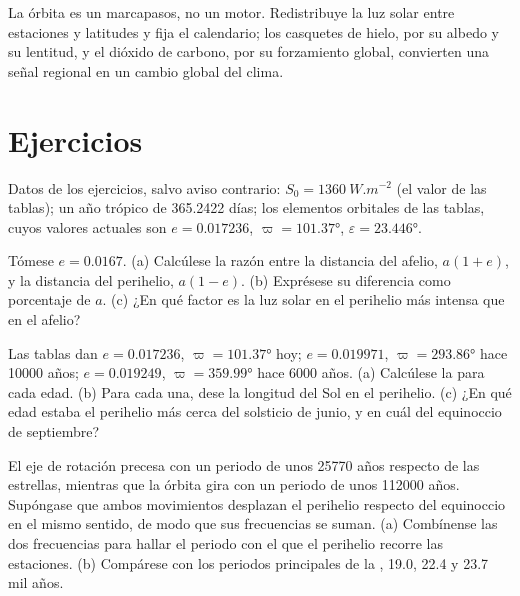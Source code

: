 La órbita es un marcapasos, no un motor. Redistribuye la luz solar entre estaciones y latitudes
y fija el calendario; los casquetes de hielo, por su albedo y su lentitud, y el dióxido de carbono, por
su forzamiento global, convierten una señal regional en un cambio global del clima.

\section*{Ejercicios}\label{sec:b2:orbital-forcing:exercises}

Datos de los ejercicios, salvo aviso contrario: $S_0 = \qty{1360}{W.m^{-2}}$ (el valor de las
tablas); un año trópico de \num{365.2422} días; los elementos orbitales de las tablas, cuyos valores actuales son
$e = 0.017236$, $\varpi = \ang{101.37}$, $\varepsilon = \ang{23.446}$.

\begin{exercise}[$\star$]\label{exo:b2:orbital-forcing:1}
Tómese $e = 0.0167$. (a) Calcúlese la razón entre la distancia del afelio, $a(1 + e)$, y la distancia
del perihelio, $a(1 - e)$. (b) Exprésese su diferencia como porcentaje de $a$. (c) ¿En qué factor es
la luz solar en el perihelio más intensa que en el afelio?
\end{exercise}

\begin{exercise}[$\star$]\label{exo:b2:orbital-forcing:2}
Las tablas dan $e = 0.017236$, $\varpi = \ang{101.37}$ hoy; $e = 0.019971$, $\varpi =
\ang{293.86}$ hace \num{10000} años; $e = 0.019249$, $\varpi = \ang{359.99}$ hace \num{6000} años.
(a) Calcúlese la  para cada edad. (b) Para cada una, dese la longitud del Sol en el
perihelio. (c) ¿En qué edad estaba el perihelio más cerca del solsticio de junio, y en cuál del
equinoccio de septiembre?
\end{exercise}

\begin{exercise}[$\star$]\label{exo:b2:orbital-forcing:3}
El eje de rotación precesa con un periodo de unos \num{25770} años respecto de las estrellas, mientras que
la órbita gira con un periodo de unos \num{112000} años. Supóngase que ambos movimientos desplazan el
perihelio respecto del equinoccio en el mismo sentido, de modo que sus frecuencias se suman. (a) Combínense
las dos frecuencias para hallar el periodo con el que el perihelio
recorre las estaciones. (b) Compárese con los periodos principales de la , \num{19.0},
\num{22.4} y \num{23.7} mil años.
\end{exercise}

